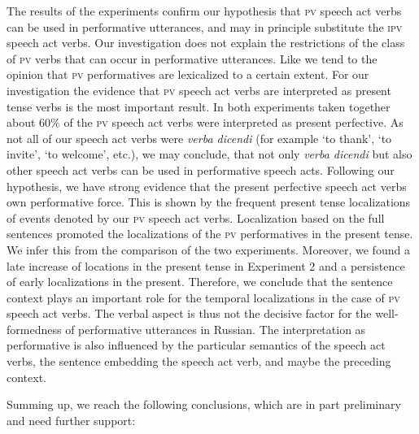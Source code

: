 \documentclass[output=paper,
colorlinks,
citecolor=brown,
newtxmath,
hidelinks
]{langscibook}
\begin{document}
The results of the experiments confirm our hypothesis that \textsc{pv} speech act verbs can be used in performative utterances, and may in principle substitute the \textsc{ipv} speech act verbs. Our investigation does not explain the restrictions of the class of \textsc{pv} verbs that can occur in performative utterances. Like \citet{Wiemer2014} we tend to the opinion that \textsc{pv} performatives are lexicalized to a certain extent. For our investigation the evidence that \textsc{pv} speech act verbs are interpreted as present tense verbs is the most important result. In both experiments taken together about $60\%$ of the \textsc{pv} speech act verbs were interpreted as present perfective. As not all of our speech act verbs were \textit{verba dicendi} (for example ‘to thank’, ‘to invite’, ‘to welcome’, etc.), we may conclude, that not only \textit{verba dicendi} but also other speech act verbs can be used in performative speech acts. Following our hypothesis, we have strong evidence that the present perfective speech act verbs own performative force. This is shown by the frequent present tense localizations of events denoted by our \textsc{pv} speech act verbs. Localization based on the full sentences promoted the localizations of the \textsc{pv} performatives in the present tense. We infer this from the comparison of the two experiments. Moreover, we found a late increase of locations in the present tense in Experiment 2 and a persistence of early localizations in the present. Therefore, we conclude that the sentence context plays an important role for the temporal localizations in the case of \textsc{pv} speech act verbs. The verbal aspect is thus not the decisive factor for the well-formedness of performative utterances in Russian. The interpretation as performative is also influenced by the particular semantics of the speech act verbs, the sentence embedding the speech act verb, and maybe the preceding context.

Summing up, we reach the following conclusions, which are in part preliminary and need further support:
\end{document}
